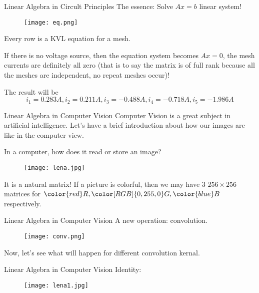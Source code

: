 \documentclass{beamer}
\begin{document}
\begin{frame}{Linear Algebra in Circult Principles}
The essence: Solve $Ax=b$ linear system!
\begin{figure}
    \centering
    \texttt{[image: eq.png]}
\end{figure}

Every row is a KVL equation for a mesh.

\vspace{3pt}
If there is no voltage source, then the equation system becomes $Ax=0$, the mesh currents are definitely all zero (that is to say the matrix is of full rank because all the meshes are independent, no repeat meshes occur)!

\vspace{3pt}
The result will be
\begin{equation*}
    i_1=0.283A,i_2=0.211A,i_3=-0.488A,i_4=-0.718A,i_5=-1.986A
\end{equation*}

\end{frame}



\begin{frame}{Linear Algebra in Computer Vision}
Computer Vision is a great subject in artificial intelligence. Let's have a brief introduction about how our images are like in the computer view.

\vspace{3pt}
In a computer, how does it read or store an image?

\begin{figure}
    \centering
    \texttt{[image: lena.jpg]}
\end{figure}
\vspace{-8pt}
It is a natural matrix! If a picture is colorful, then we may have 3 $256\times 256$ matrices for ${\color{red} R}, {\color[RGB]{0, 255, 0} G}, {\color{blue} B}$ respectively.
\end{frame}

\begin{frame}{Linear Algebra in Computer Vision}
A new operation: convolution.

\begin{figure}
    \centering
    \texttt{[image: conv.png]}
\end{figure}

Now, let's see what will happen for different convolution kernal.
\end{frame}

\begin{frame}{Linear Algebra in Computer Vision}
Identity:
\begin{figure}
    \centering
    \texttt{[image: lena1.jpg]}
\end{figure}

\end{frame}
\end{document}
